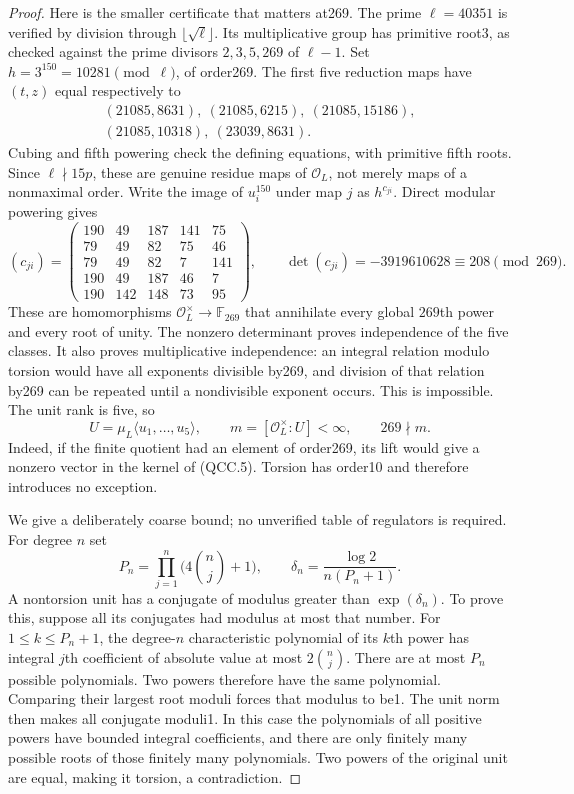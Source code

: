 \begin{proof}
Here is the smaller certificate that matters at269.  The prime
$\ell=40351$ is verified by division through $\lfloor\sqrt\ell\rfloor$.
Its multiplicative group has primitive root3, as checked against the
prime divisors $2,3,5,269$ of $\ell-1$.  Set
$h=3^{150}=10281\pmod\ell$, of order269.  The first five reduction
maps have $(t,z)$ equal respectively to
\[
 \begin{gathered}
 (21085,8631),\ (21085,6215),\ (21085,15186),\\
 (21085,10318),\ (23039,8631).
 \end{gathered}
 \tag{QCC.4}
\]
Cubing and fifth powering check the defining equations, with primitive
fifth roots.  Since $\ell\nmid15p$, these are genuine residue maps of
$\mathcal O_L$, not merely maps of a nonmaximal order.
Write the image of $u_i^{150}$ under map $j$ as $h^{c_{ji}}$.
Direct modular powering gives
\[
 (c_{ji})=
 \begin{pmatrix}
 190&49&187&141&75\\
 79&49&82&75&46\\
 79&49&82&7&141\\
 190&49&187&46&7\\
 190&142&148&73&95
 \end{pmatrix},\qquad
 \det(c_{ji})=-3919610628\equiv208\pmod{269}.
 \tag{QCC.5}
\]
These are homomorphisms $\mathcal O_L^\times\to\mathbb F_{269}$
that annihilate every global $269$th power and every root of unity.
The nonzero determinant proves independence of the five classes.
It also proves multiplicative independence: an integral relation
modulo torsion would have all exponents divisible by269, and division
of that relation by269 can be repeated until a nondivisible exponent
occurs.  This is impossible.  The unit rank is five, so
\[
 U=\mu_L\langle u_1,\ldots,u_5\rangle,\qquad
 m=[\mathcal O_L^\times:U]<\infty,\qquad 269\nmid m.
 \tag{QCC.6}
\]
Indeed, if the finite quotient had an element of order269, its lift
would give a nonzero vector in the kernel of (QCC.5).  Torsion has
order10 and therefore introduces no exception.

We give a deliberately coarse bound; no unverified table of regulators
is required.  For degree $n$ set
\[
 P_n=\prod_{j=1}^{n}\bigl(4\binom nj+1\bigr),\qquad
 \delta_n=\frac{\log2}{n(P_n+1)}.
 \tag{QCC.7}
\]
A nontorsion unit has a conjugate of modulus greater than
$\exp(\delta_n)$.  To prove this, suppose all its conjugates had
modulus at most that number.  For $1\le k\le P_n+1$, the degree-$n$
characteristic polynomial of its $k$th power has integral $j$th
coefficient of absolute value at most $2\binom nj$.  There are at
most $P_n$ possible polynomials.  Two powers therefore have the same
polynomial.  Comparing their largest root moduli forces that modulus
to be1.  The unit norm then makes all conjugate moduli1.  In this
case the polynomials of all positive powers have bounded integral
coefficients, and there are only finitely many possible roots of
those finitely many polynomials.  Two powers of the original unit
are equal, making it torsion, a contradiction.


\end{proof}
